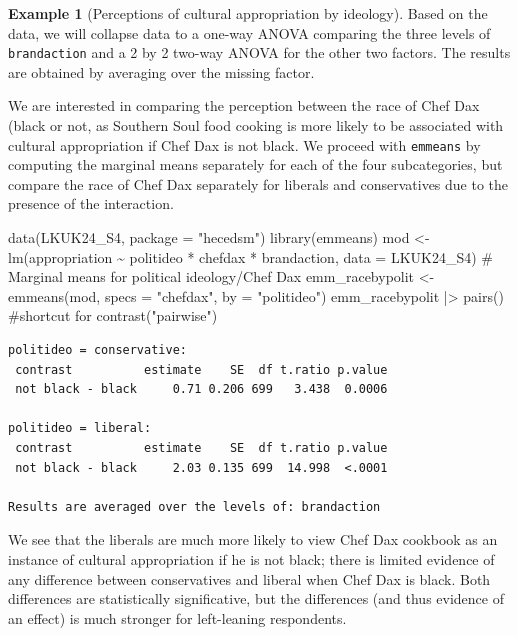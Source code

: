 \documentclass[
  11pt,
  letterpaper,
]{scrbook}
\newenvironment{Shaded}{\begin{snugshade}}{\end{snugshade}}
\newcommand{\AttributeTok}[1]{\textcolor[rgb]{0.40,0.45,0.13}{#1}}
\newcommand{\CommentTok}[1]{\textcolor[rgb]{0.37,0.37,0.37}{#1}}
\newcommand{\FunctionTok}[1]{\textcolor[rgb]{0.28,0.35,0.67}{#1}}
\newcommand{\NormalTok}[1]{\textcolor[rgb]{0.00,0.23,0.31}{#1}}
\newcommand{\OtherTok}[1]{\textcolor[rgb]{0.00,0.23,0.31}{#1}}
\newcommand{\SpecialCharTok}[1]{\textcolor[rgb]{0.37,0.37,0.37}{#1}}
\newcommand{\StringTok}[1]{\textcolor[rgb]{0.13,0.47,0.30}{#1}}
\theoremstyle{definition}
\newtheorem{example}{Example}[chapter]
\theoremstyle{definition}
\theoremstyle{remark}
\begin{document}
\begin{example}[Perceptions of cultural appropriation by
ideology]
Based on the data, we will collapse data to a one-way ANOVA comparing
the three levels of \texttt{brandaction} and a 2 by 2 two-way ANOVA for
the other two factors. The results are obtained by averaging over the
missing factor.

We are interested in comparing the perception between the race of Chef
Dax (black or not, as Southern Soul food cooking is more likely to be
associated with cultural appropriation if Chef Dax is not black. We
proceed with \texttt{emmeans} by computing the marginal means separately
for each of the four subcategories, but compare the race of Chef Dax
separately for liberals and conservatives due to the presence of the
interaction.

\begin{Shaded}
\begin{Highlighting}[]
\FunctionTok{data}\NormalTok{(LKUK24\_S4, }\AttributeTok{package =} \StringTok{"hecedsm"}\NormalTok{)}
\FunctionTok{library}\NormalTok{(emmeans)}
\NormalTok{mod }\OtherTok{\textless{}{-}} \FunctionTok{lm}\NormalTok{(appropriation }\SpecialCharTok{\textasciitilde{}}\NormalTok{ politideo }\SpecialCharTok{*}\NormalTok{ chefdax }\SpecialCharTok{*}\NormalTok{ brandaction,}
   \AttributeTok{data =}\NormalTok{ LKUK24\_S4)}
\CommentTok{\# Marginal means for political ideology/Chef Dax}
\NormalTok{emm\_racebypolit }\OtherTok{\textless{}{-}} \FunctionTok{emmeans}\NormalTok{(mod, }\AttributeTok{specs =} \StringTok{"chefdax"}\NormalTok{, }\AttributeTok{by =} \StringTok{"politideo"}\NormalTok{)}
\NormalTok{emm\_racebypolit }\SpecialCharTok{|\textgreater{}} \FunctionTok{pairs}\NormalTok{() }\CommentTok{\#shortcut for contrast("pairwise")}
\end{Highlighting}
\end{Shaded}

\begin{verbatim}
politideo = conservative:
 contrast          estimate    SE  df t.ratio p.value
 not black - black     0.71 0.206 699   3.438  0.0006

politideo = liberal:
 contrast          estimate    SE  df t.ratio p.value
 not black - black     2.03 0.135 699  14.998  <.0001

Results are averaged over the levels of: brandaction 
\end{verbatim}

We see that the liberals are much more likely to view Chef Dax cookbook
as an instance of cultural appropriation if he is not black; there is
limited evidence of any difference between conservatives and liberal
when Chef Dax is black. Both differences are statistically
significative, but the differences (and thus evidence of an effect) is
much stronger for left-leaning respondents.


\end{example}
\end{document}
